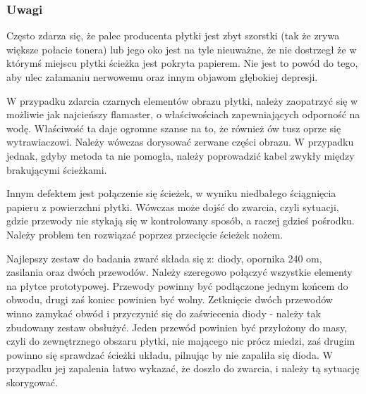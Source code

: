 \subsubsection{Uwagi}

Często zdarza się, że palec producenta płytki jest zbyt szorstki (tak że zrywa większe połacie tonera) lub jego oko jest na tyle nieuważne, że nie dostrzegł że w którymś miejscu płytki ścieżka jest pokryta papierem. Nie jest to powód do tego, aby ulec załamaniu nerwowemu oraz innym objawom głębokiej depresji.

W przypadku zdarcia czarnych elementów obrazu płytki, należy zaopatrzyć się w możliwie jak najcieńszy flamaster, o właściwościach zapewniających odporność na wodę. Właściwość ta daje ogromne szanse na to, że również ów tusz oprze się wytrawiaczowi. Należy wówczas dorysować zerwane części obrazu. W przypadku jednak, gdyby metoda ta nie pomogła, należy poprowadzić kabel zwykły między brakującymi ścieżkami. 

Innym defektem jest połączenie się ścieżek, w wyniku niedbałego ściągnięcia papieru z powierzchni płytki. Wówczas może dojść do zwarcia, czyli sytuacji, gdzie przewody nie stykają się w kontrolowany sposób, a raczej gdzieś pośrodku. Należy problem ten rozwiązać poprzez przecięcie ścieżek nożem. 

Najlepszy zestaw do badania zwarć składa się z: diody, opornika 240 om, zasilania oraz dwóch przewodów. Należy szeregowo połączyć wszystkie elementy na płytce prototypowej. Przewody powinny być podłączone jednym końcem do obwodu, drugi zaś koniec powinien być wolny. Zetknięcie dwóch przewodów winno zamykać obwód i przyczynić się do zaświecenia diody - należy tak zbudowany zestaw obsłużyć. Jeden przewód powinien być przyłożony do masy, czyli do zewnętrznego obszaru płytki, nie mającego nic prócz miedzi, zaś drugim powinno się sprawdzać ścieżki układu, pilnując by nie zapaliła się dioda. W przypadku jej zapalenia łatwo wykazać, że doszło do zwarcia, i należy tą sytuację skorygować.